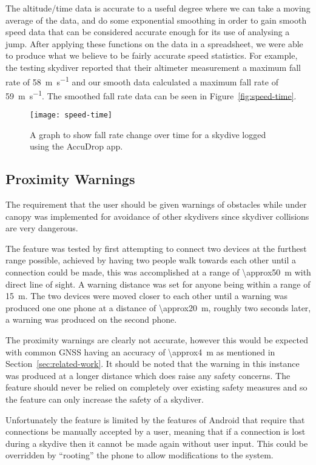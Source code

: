 The altitude/time data is accurate to a useful degree where we can take a moving average of the data, and do some exponential smoothing in order to gain smooth speed data that can be considered accurate enough for its use of analysing a jump. After applying these functions on the data in a spreadsheet, we were able to produce what we believe to be fairly accurate speed statistics. For example, the testing skydiver reported that their altimeter measurement a maximum fall rate of \SI{58}{\metre\per\second} and our smooth data calculated a maximum fall rate of \SI{59}{\metre\per\second}. The smoothed fall rate data can be seen in Figure~\vref{fig:speed-time}.

\begin{figure}[ht]
  \centering
  \texttt{[image: speed-time]}
  \caption{A graph to show fall rate change over time for a skydive logged using the AccuDrop app.}\label{fig:speed-time}
\end{figure}

\subsection{Proximity Warnings}
The requirement that the user should be given warnings of obstacles while under canopy was implemented for avoidance of other skydivers since skydiver collisions are very dangerous.

The feature was tested by first attempting to connect two devices at the furthest range possible, achieved by having two people walk towards each other until a connection could be made, this was accomplished at a range of \SI{\approx50}{\metre} with direct line of sight. A warning distance was set for anyone being within a range of \SI{15}{\metre}. The two devices were moved closer to each other until a warning was produced one one phone at a distance of \SI{\approx20}{\metre}, roughly two seconds later, a warning was produced on the second phone.

The proximity warnings are clearly not accurate, however this would be expected with common GNSS having an accuracy of \SI{\approx4}{\metre} as mentioned in Section~\ref{sec:related-work}. It should be noted that the warning in this instance was produced at a longer distance which does raise any safety concerns. The feature should never be relied on completely over existing safety measures and so the feature can only increase the safety of a skydiver.

Unfortunately the feature is limited by the features of Android that require that connections be manually accepted by a user, meaning that if a connection is lost during a skydive then it cannot be made again without user input. This could be overridden by ``rooting'' the phone to allow modifications to the system.

